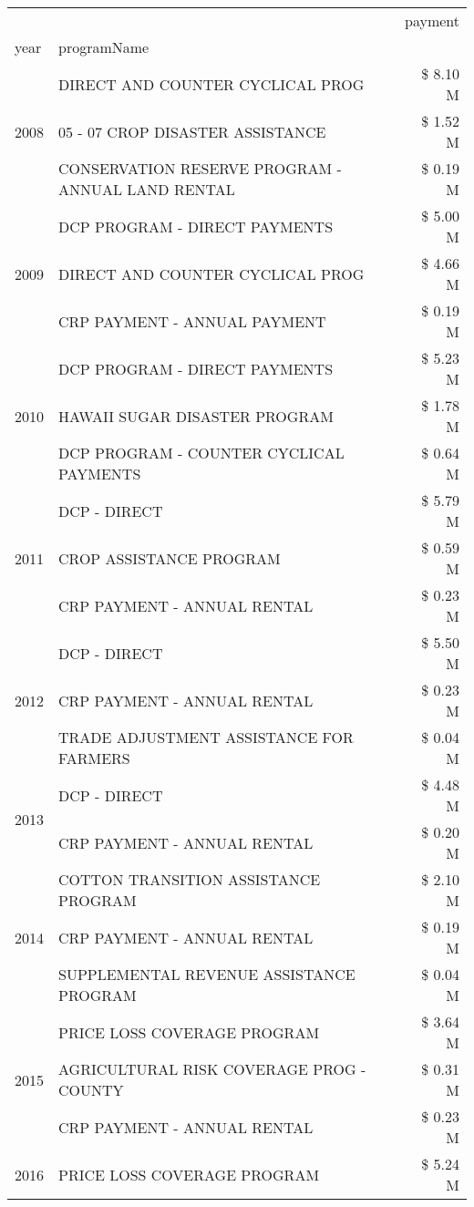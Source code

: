 \begin{tabular}{llr}
\toprule
 &  & payment \\
year & programName &  \\
\midrule
\multirow[t]{3}{*}{2008} & DIRECT AND COUNTER CYCLICAL PROG & \$ 8.10 M \\
 & 05 - 07 CROP DISASTER ASSISTANCE & \$ 1.52 M \\
 & CONSERVATION RESERVE PROGRAM - ANNUAL LAND RENTAL & \$ 0.19 M \\
\cline{1-3}
\multirow[t]{3}{*}{2009} & DCP PROGRAM - DIRECT PAYMENTS & \$ 5.00 M \\
 & DIRECT AND COUNTER CYCLICAL PROG & \$ 4.66 M \\
 & CRP PAYMENT - ANNUAL PAYMENT & \$ 0.19 M \\
\cline{1-3}
\multirow[t]{3}{*}{2010} & DCP PROGRAM - DIRECT PAYMENTS & \$ 5.23 M \\
 & HAWAII SUGAR DISASTER PROGRAM & \$ 1.78 M \\
 & DCP PROGRAM - COUNTER CYCLICAL PAYMENTS & \$ 0.64 M \\
\cline{1-3}
\multirow[t]{3}{*}{2011} & DCP - DIRECT & \$ 5.79 M \\
 & CROP ASSISTANCE PROGRAM & \$ 0.59 M \\
 & CRP PAYMENT - ANNUAL RENTAL & \$ 0.23 M \\
\cline{1-3}
\multirow[t]{3}{*}{2012} & DCP - DIRECT & \$ 5.50 M \\
 & CRP PAYMENT - ANNUAL RENTAL & \$ 0.23 M \\
 & TRADE ADJUSTMENT ASSISTANCE FOR FARMERS & \$ 0.04 M \\
\cline{1-3}
\multirow[t]{2}{*}{2013} & DCP - DIRECT & \$ 4.48 M \\
 & CRP PAYMENT - ANNUAL RENTAL & \$ 0.20 M \\
\cline{1-3}
\multirow[t]{3}{*}{2014} & COTTON TRANSITION ASSISTANCE PROGRAM & \$ 2.10 M \\
 & CRP PAYMENT - ANNUAL RENTAL & \$ 0.19 M \\
 & SUPPLEMENTAL REVENUE ASSISTANCE PROGRAM & \$ 0.04 M \\
\cline{1-3}
\multirow[t]{3}{*}{2015} & PRICE LOSS COVERAGE PROGRAM & \$ 3.64 M \\
 & AGRICULTURAL RISK COVERAGE PROG - COUNTY & \$ 0.31 M \\
 & CRP PAYMENT - ANNUAL RENTAL & \$ 0.23 M \\
\cline{1-3}
\multirow[t]{3}{*}{2016} & PRICE LOSS COVERAGE PROGRAM & \$ 5.24 M \\

\end{tabular}
